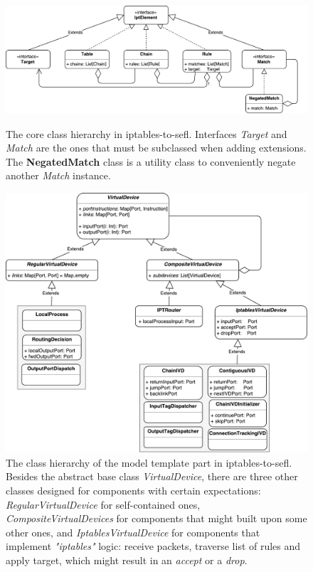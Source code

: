\clearpage
\begin{figure}[h]
  \centering

  \includegraphics[scale=0.5]{src/img/ipt-hierarchy}
  \caption[The core class hierarchy in iptables-to-sefl.]{The core class
  hierarchy in iptables-to-sefl.  Interfaces \emph{Target} and \emph{Match} are
  the ones that must be subclassed when adding extensions.  The
  \textbf{NegatedMatch} class is a utility class to conveniently negate another
  \emph{Match} instance.}
  \label{fig:ipt-hierarchy}

  \vspace*{\floatsep} %

  \includegraphics[scale=0.55]{src/img/virtdev-hierarchy}
  \caption[The class hierarchy of the model template part in
  iptables-to-sefl.]{The class hierarchy of the model template part in
  iptables-to-sefl. Besides the abstract base class \emph{VirtualDevice}, there
  are three other classes designed for components with certain expectations:
  \emph{RegularVirtualDevice} for self-contained ones,
  \emph{CompositeVirtualDevices} for components that might built upon some
  other ones, and \emph{IptablesVirtualDevice} for components that implement
  \emph{"iptables"} logic: receive packets, traverse list of rules and apply
  target, which might result in an \emph{accept} or a \emph{drop}.}
  \label{fig:virtdev-hierarchy}
\end{figure}
\clearpage

